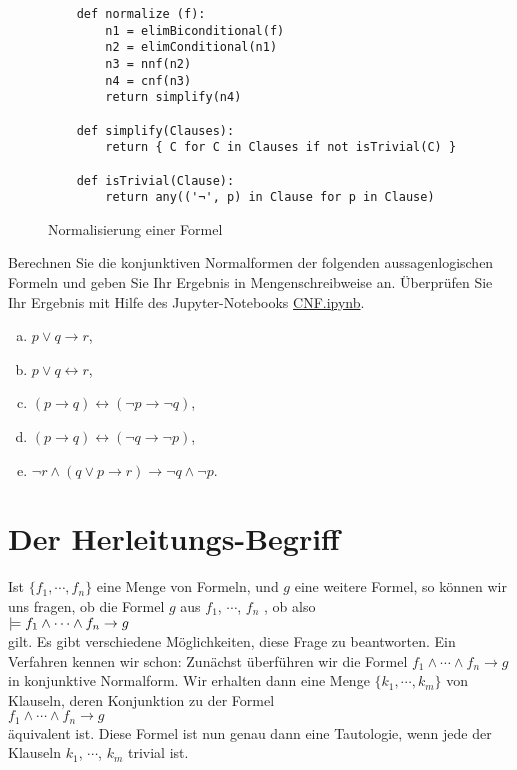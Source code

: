 \begin{figure}[!ht]
  \centering
\begin{verbatim}
    def normalize (f):
        n1 = elimBiconditional(f)
        n2 = elimConditional(n1)
        n3 = nnf(n2)
        n4 = cnf(n3)
        return simplify(n4)
    
    def simplify(Clauses):
        return { C for C in Clauses if not isTrivial(C) }
    
    def isTrivial(Clause):
        return any(('¬', p) in Clause for p in Clause)
\end{verbatim} 
\vspace*{-0.3cm}
  \caption{Normalisierung einer Formel}
  \label{fig:normalize}
\end{figure}

\exercise
Berechnen Sie die konjunktiven Normalformen der folgenden aussagenlogischen Formeln und geben Sie Ihr Ergebnis
in Mengenschreibweise an.  Überprüfen Sie Ihr Ergebnis mit Hilfe des Jupyter-Notebooks 
\href{https://github.com/karlstroetmann/Logic/blob/master/Python/Chapter-4/CNF.ipynb}{CNF.ipynb}.
\begin{enumerate}[(a)]
\item $p \vee q \rightarrow r$,
\item $p \vee q \leftrightarrow r$,
\item $(p \rightarrow q) \leftrightarrow (\neg p \rightarrow \neg q)$,
\item $(p \rightarrow q) \leftrightarrow (\neg q \rightarrow \neg p)$,
\item $\neg r \wedge (q \vee p \rightarrow r) \rightarrow \neg q \wedge \neg p$.
\end{enumerate}


\section{Der Herleitungs-Begriff}
Ist $\{f_1,\cdots,f_n\}$ eine Menge von Formeln, und $g$ eine weitere Formel, so
können wir uns fragen, ob  die  Formel $g$ aus $f_1$, $\cdots$, $f_n$ , ob
also 
\\[0.2cm]
\hspace*{1.3cm}
$\displaystyle \models f_1 \wedge \cdots \wedge f_n \rightarrow g$
\\[0.2cm]
gilt.
Es gibt verschiedene Möglichkeiten, diese Frage zu beantworten.  Ein Verfahren kennen wir
schon: Zunächst überführen wir die Formel  $f_1 \wedge \cdots \wedge f_n \rightarrow g$ in
konjunktive Normalform.  Wir erhalten dann eine Menge
$\{k_1,\cdots,k_m\}$ von Klauseln, deren Konjunktion zu der  Formel
\\[0.2cm]
\hspace*{1.3cm}
$f_1 \wedge \cdots \wedge f_n \rightarrow g$
\\[0.2cm] 
äquivalent ist.  Diese Formel ist nun genau dann eine Tautologie, wenn
jede der Klauseln $k_1$, $\cdots$, $k_m$ trivial ist.  

